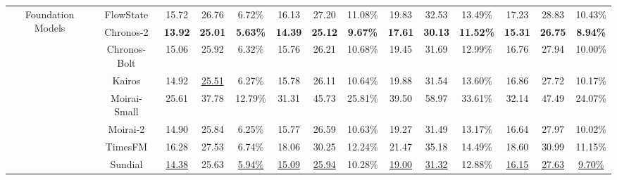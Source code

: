 \documentclass[10pt]{article}
\begin{document}
\begin{table}[t]
{\begin{tabular}{c|c|c|c|c|c|c|c|c|c|c|c|c|c}
\midrule
\multirow{8}{*}{Foundation Models} & FlowState& 15.72 & 26.76 & 6.72\% & 16.13 & 27.20 & 11.08\% & 19.83 & 32.53 & 13.49\% & 17.23 & 28.83 & 10.43\% \\
& Chronos-2 & \textbf{13.92} & \textbf{25.01} & \textbf{5.63\%} & \textbf{14.39} & \textbf{25.12} & \textbf{9.67\%} & \textbf{17.61} & \textbf{30.13} & \textbf{11.52\%} & \textbf{15.31} & \textbf{26.75} & \textbf{8.94\%} \\
& Chronos-Bolt & 15.06 & 25.92 & 6.32\% & 15.76 & 26.21 & 10.68\% & 19.45 & 31.69 & 12.99\% & 16.76 & 27.94 & 10.00\% \\
& Kairos & 14.92 & \underline{25.51} & 6.27\% & 15.78 & 26.11 & 10.64\% & 19.88 & 31.54 & 13.60\% & 16.86 & 27.72 & 10.17\% \\
& Moirai-Small & 25.61 & 37.78 & 12.79\% & 31.31 & 45.73 & 25.81\% & 39.50 & 58.97 & 33.61\% & 32.14 & 47.49 & 24.07\% \\
& Moirai-2 & 14.90 & 25.84 & 6.25\% & 15.77 & 26.59 & 10.63\% & 19.27 & 31.49 & 13.17\% & 16.64 & 27.97 & 10.02\% \\
& TimesFM & 16.28 & 27.53 & 6.74\% & 18.06 & 30.25 & 12.24\% & 21.47 & 35.18 & 14.49\% & 18.60 & 30.99 & 11.15\% \\
& Sundial& \underline{14.38} & 25.63 & \underline{5.94\%} & \underline{15.09} & \underline{25.94} & 10.28\% & \underline{19.00} & \underline{31.32} & 12.88\% & \underline{16.15} & \underline{27.63} & \underline{9.70\%} \\

\bottomrule
\end{tabular}
}

\end{table}
\end{document}
